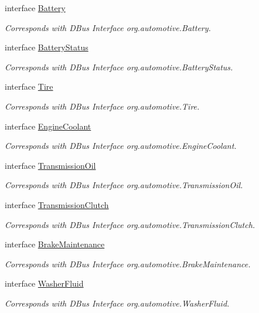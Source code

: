 \begin{DoxyCompactItemize}
interface \hyperlink{interfaceBattery}{Battery}
\begin{DoxyCompactList}\small\item\em Corresponds with D\+Bus Interface org.\+automotive.\+Battery. \end{DoxyCompactList}\item 
interface \hyperlink{interfaceBatteryStatus}{Battery\+Status}
\begin{DoxyCompactList}\small\item\em Corresponds with D\+Bus Interface org.\+automotive.\+Battery\+Status. \end{DoxyCompactList}\item 
interface \hyperlink{interfaceTire}{Tire}
\begin{DoxyCompactList}\small\item\em Corresponds with D\+Bus Interface org.\+automotive.\+Tire. \end{DoxyCompactList}\item 
interface \hyperlink{interfaceEngineCoolant}{Engine\+Coolant}
\begin{DoxyCompactList}\small\item\em Corresponds with D\+Bus Interface org.\+automotive.\+Engine\+Coolant. \end{DoxyCompactList}\item 
interface \hyperlink{interfaceTransmissionOil}{Transmission\+Oil}
\begin{DoxyCompactList}\small\item\em Corresponds with D\+Bus Interface org.\+automotive.\+Transmission\+Oil. \end{DoxyCompactList}\item 
interface \hyperlink{interfaceTransmissionClutch}{Transmission\+Clutch}
\begin{DoxyCompactList}\small\item\em Corresponds with D\+Bus Interface org.\+automotive.\+Transmission\+Clutch. \end{DoxyCompactList}\item 
interface \hyperlink{interfaceBrakeMaintenance}{Brake\+Maintenance}
\begin{DoxyCompactList}\small\item\em Corresponds with D\+Bus Interface org.\+automotive.\+Brake\+Maintenance. \end{DoxyCompactList}\item 
interface \hyperlink{interfaceWasherFluid}{Washer\+Fluid}
\begin{DoxyCompactList}\small\item\em Corresponds with D\+Bus Interface org.\+automotive.\+Washer\+Fluid. \end{DoxyCompactList}\item 

\end{DoxyCompactItemize}
